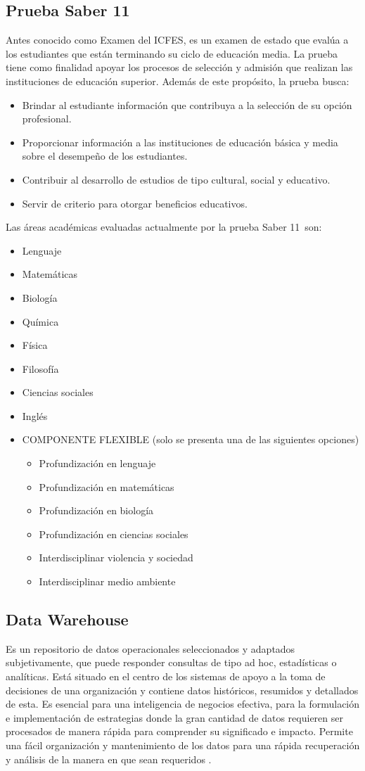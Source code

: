 \subsection{Prueba Saber 11\degree}\label{sec:saber11}
Antes conocido como Examen del ICFES, es un examen de estado que evalúa a los estudiantes que están terminando su ciclo de educación media. La prueba tiene como finalidad apoyar los procesos de selección y admisión que realizan las instituciones de educación superior. Además de este propósito, la prueba busca:
\begin{itemize}
\item Brindar al estudiante información que contribuya a la selección de
su opción profesional. 
\item Proporcionar información a las instituciones de educación básica y
media sobre el desempeño de los estudiantes. 
\item Contribuir al desarrollo de estudios de tipo cultural, social y educativo. 
\item Servir de criterio para otorgar beneficios educativos. 
\end{itemize}
Las áreas académicas evaluadas actualmente por la prueba Saber 11\degree \ son:
\begin{itemize}
\item Lenguaje 
\item Matemáticas 
\item Biología 
\item Química 
\item Física 
\item Filosofía 
\item Ciencias sociales 
\item Inglés 
\item COMPONENTE FLEXIBLE (solo se presenta una de las siguientes opciones)
\begin{itemize}
\item Profundización en lenguaje 
\item Profundización en matemáticas 
\item Profundización en biología 
\item Profundización en ciencias sociales 
\item Interdisciplinar violencia y sociedad 
\item Interdisciplinar medio ambiente
\end{itemize}
\end{itemize}
\subsection{Data Warehouse}
Es un repositorio de datos operacionales seleccionados y adaptados subjetivamente, que puede responder consultas de tipo ad hoc, estadísticas o analíticas. Está situado en el centro de los sistemas de apoyo a la toma de decisiones de una organización y contiene datos históricos, resumidos y detallados de esta. Es esencial para una inteligencia de negocios efectiva, para la formulación e implementación de estrategias donde la gran cantidad de datos requieren ser procesados de manera rápida para comprender su significado e impacto. Permite una fácil organización y mantenimiento de los datos para una rápida recuperación y análisis de la manera en que sean requeridos \cite{key-90}.
